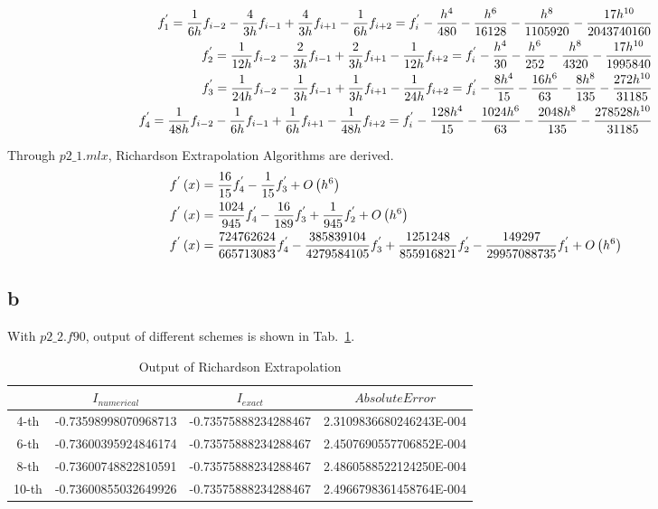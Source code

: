 \documentclass[letterpaper,10pt]{article}
\begin{document}
\begin{align}
  f^{'}_{1} = \frac{1}{6h}f_{i-2}-\frac{4}{3h}f_{i-1}+\frac{4}{3h}f_{i+1}-\frac{1}{6h}f_{i+2}
  = f_{i}^{'} - \frac{h^4}{480} - \frac{h^6}{16128} - \frac{h^8}{1105920} - \frac{17h^{10}}{2043740160} \notag\\
  f^{'}_{2} = \frac{1}{12h}f_{i-2}-\frac{2}{3h}f_{i-1}+\frac{2}{3h}f_{i+1}-\frac{1}{12h}f_{i+2}
  = f_{i}^{'} - \frac{h^4}{30} - \frac{h^6}{252} - \frac{h^8}{4320} - \frac{17h^{10}}{1995840} \notag\\
  f^{'}_{3} = \frac{1}{24h}f_{i-2}-\frac{1}{3h}f_{i-1}+\frac{1}{3h}f_{i+1}-\frac{1}{24h}f_{i+2}
  = f_{i}^{'} - \frac{8h^4}{15} - \frac{16h^6}{63} - \frac{8h^8}{135} - \frac{272h^{10}}{31185} \notag\\
  f^{'}_{4} = \frac{1}{48h}f_{i-2}-\frac{1}{6h}f_{i-1}+\frac{1}{6h}f_{i+1}-\frac{1}{48h}f_{i+2}
  = f_{i}^{'} - \frac{128h^4}{15} - \frac{1024h^6}{63} - \frac{2048h^8}{135} - \frac{278528h^{10}}{31185} \notag
\end{align}

Through $p2\_1.mlx$, Richardson Extrapolation Algorithms are derived. 
\begin{align}
   f^{'}\left(x\right) &= \frac{16}{15}f^{'}_{4} - \frac{1}{15}f^{'}_{3} + O\left(h^6\right)\notag\\
   f^{'}\left(x\right) &= \frac{1024}{945}f^{'}_{4} - \frac{16}{189}f^{'}_{3} + \frac{1}{945}f^{'}_{2}+O\left(h^6\right)\notag\\
   f^{'}\left(x\right) &= \frac{724762624}{665713083}f^{'}_{4} - \frac{385839104}{4279584105}f^{'}_{3} + \frac{1251248}{855916821}f^{'}_{2} - \frac{149297}{29957088735}f^{'}_{1}+O\left(h^6\right)\notag
\end{align}
\subsection{b}
With $p2\_2.f90$, output of different schemes is shown in Tab.~\ref{tab2_1}. 

\begin{table}[htbp]
  \centering  
  \caption{Output of Richardson Extrapolation}\label{tab2_1}
  \begin{tabular}{cccc}
    \hline
    & $I_{numerical}$ & $I_{exact}$ & $Absolute Error$ \\
    \hline
    4-th & -0.73598998070968713 & -0.73575888234288467 & 2.3109836680246243E-004\\
    6-th & -0.73600395924846174 & -0.73575888234288467 & 2.4507690557706852E-004\\
    8-th & -0.73600748822810591 & -0.73575888234288467 & 2.4860588522124250E-004\\
    10-th & -0.73600855032649926& -0.73575888234288467 & 2.4966798361458764E-004\\
    \hline
  \end{tabular}
\end{table}       
        
\end{document}
